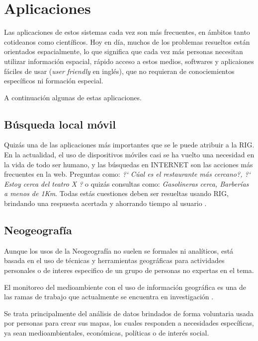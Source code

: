 \section{Aplicaciones}\label{sec:appl}

Las aplicaciones de estos sistemas cada vez son más frecuentes, en ámbitos
tanto cotideanos como científicos. Hoy en día, muchos de los problemas
resueltos están orientados espacialmente, lo que significa que cada vez más
personas necesitan utilizar información espacial, rápido acceso a estos medios,
softwares y aplicaiones fáciles de usar (\emph{user friendly} en inglés), que no
requieran de conociemientos específicos ni formación especial.

A continuación algunas de estas aplicaciones.

\subsection{Búsqueda local móvil}\label{sec:mobile}

Quizás una de las aplicaciones más importantes que se le puede atribuir a la
RIG. En la actualidad, el uso de dispositivos móviles casi se ha vuelto una
necesidad en la vida de todo ser humano, y las búsquedas en INTERNET son las
acciones más frecuentes en la web. Preguntas como: \emph{?` Cúal es el
restaurante más cercano?, ?` Estoy cerca del teatro X ?} o quizás consultas
como: \emph{Gasolineras cerca, Barberías a menos de 1Km}. Todas estás
cuestiones deben ser resueltas usando RIG, brindando una respuesta acertada y
ahorrando tiempo al usuario \cite{teevan2011, lymberopoulos2011}. 

\subsection{Neogeografía}\label{sec:neogeo}

Aunque los usos de la Neogeografía no suelen se formales ni analíticos, está
basada en el uso de técnicas y herramientas geográficas para actividades
personales o de interes especifico de un grupo de personas no expertas en el
tema.\cite{turner2006}

El monitoreo del medioambiente con el uso de información geográfica es una de
las ramas de trabajo que actualmente se encuentra en investigación
\cite{connors2012}. 

Se trata principalmente del análisis de datos brindados de forma voluntaria
usada por personas para crear sus mapas, los cuales responden a necesidades
específicas, ya sean medioambientales, económicas, políticas o de interés
social. \cite{harris2012}

